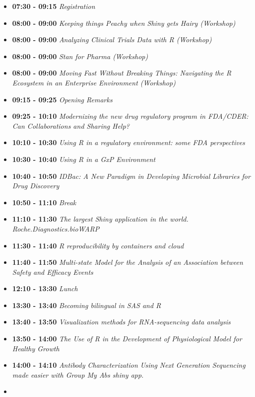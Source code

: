 \documentclass[]{book}
\providecommand{\tightlist}{%
  \setlength{\itemsep}{0pt}\setlength{\parskip}{0pt}}
\theoremstyle{definition}
\theoremstyle{definition}
\theoremstyle{definition}
\theoremstyle{remark}
\begin{document}
\begin{itemize}
\tightlist
\item
  \textbf{07:30 - 09:15} \emph{Registration}
\item
  \textbf{08:00 - 09:00} \emph{Keeping things Peachy when Shiny gets
  Hairy (Workshop)}
\item
  \textbf{08:00 - 09:00} \emph{Analyzing Clinical Trials Data with R
  (Workshop)}
\item
  \textbf{08:00 - 09:00} \emph{Stan for Pharma (Workshop)}
\item
  \textbf{08:00 - 09:00} \emph{Moving Fast Without Breaking Things:
  Navigating the R Ecosystem in an Enterprise Environment (Workshop)}
\item
  \textbf{09:15 - 09:25} \emph{Opening Remarks}
\item
  \textbf{09:25 - 10:10} \emph{Modernizing the new drug regulatory
  program in FDA/CDER: Can Collaborations and Sharing Help?}
\item
  \textbf{10:10 - 10:30} \emph{Using R in a regulatory environment: some
  FDA perspectives}
\item
  \textbf{10:30 - 10:40} \emph{Using R in a GxP Environment}
\item
  \textbf{10:40 - 10:50} \emph{IDBac: A New Paradigm in Developing
  Microbial Libraries for Drug Discovery}
\item
  \textbf{10:50 - 11:10} \emph{Break}
\item
  \textbf{11:10 - 11:30} \emph{The largest Shiny application in the
  world. Roche.Diagnostics.bioWARP}
\item
  \textbf{11:30 - 11:40} \emph{R reproducibility by containers and
  cloud}
\item
  \textbf{11:40 - 11:50} \emph{Multi-state Model for the Analysis of an
  Association between Safety and Efficacy Events}
\item
  \textbf{12:10 - 13:30} \emph{Lunch}
\item
  \textbf{13:30 - 13:40} \emph{Becoming bilingual in SAS and R}
\item
  \textbf{13:40 - 13:50} \emph{Visualization methods for RNA-sequencing
  data analysis}
\item
  \textbf{13:50 - 14:00} \emph{The Use of R in the Development of
  Physiological Model for Healthy Growth}
\item
  \textbf{14:00 - 14:10} \emph{Antibody Characterization Using Next
  Generation Sequencing made easier with Group My Abs shiny app.}
\item

\end{itemize}
\end{document}
